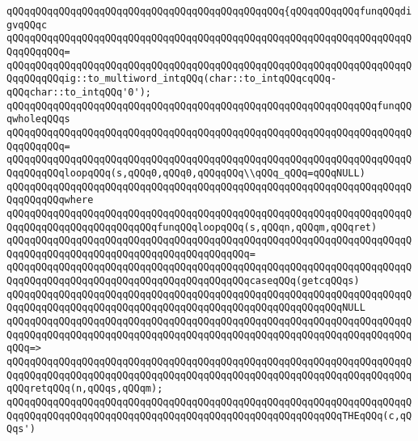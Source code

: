 \verb|qQQqqQQqqQQqqQQqqQQqqQQqqQQqqQQqqQQqqQQqqQQqqQQq{qQQqqQQqqQQqfunqQQqdigvqQQqc|\newline
\verb|qQQqqQQqqQQqqQQqqQQqqQQqqQQqqQQqqQQqqQQqqQQqqQQqqQQqqQQqqQQqqQQqqQQqqQQqqQQqqQQq=|\newline
\verb|qQQqqQQqqQQqqQQqqQQqqQQqqQQqqQQqqQQqqQQqqQQqqQQqqQQqqQQqqQQqqQQqqQQqqQQqqQQqqQQqig::to_multiword_intqQQq(char::to_intqQQqcqQQq-qQQqchar::to_intqQQq'0');|\newline
\newline
\verb|qQQqqQQqqQQqqQQqqQQqqQQqqQQqqQQqqQQqqQQqqQQqqQQqqQQqqQQqqQQqqQQqfunqQQqwholeqQQqs|\newline
\verb|qQQqqQQqqQQqqQQqqQQqqQQqqQQqqQQqqQQqqQQqqQQqqQQqqQQqqQQqqQQqqQQqqQQqqQQqqQQqqQQq=|\newline
\verb|qQQqqQQqqQQqqQQqqQQqqQQqqQQqqQQqqQQqqQQqqQQqqQQqqQQqqQQqqQQqqQQqqQQqqQQqqQQqqQQqloopqQQq(s,qQQq0,qQQq0,qQQqqQQq\\qQQq_qQQq=qQQqNULL)|\newline
\verb|qQQqqQQqqQQqqQQqqQQqqQQqqQQqqQQqqQQqqQQqqQQqqQQqqQQqqQQqqQQqqQQqqQQqqQQqqQQqqQQqwhere|\newline
\verb|qQQqqQQqqQQqqQQqqQQqqQQqqQQqqQQqqQQqqQQqqQQqqQQqqQQqqQQqqQQqqQQqqQQqqQQqqQQqqQQqqQQqqQQqqQQqqQQqfunqQQqloopqQQq(s,qQQqn,qQQqm,qQQqret)|\newline
\verb|qQQqqQQqqQQqqQQqqQQqqQQqqQQqqQQqqQQqqQQqqQQqqQQqqQQqqQQqqQQqqQQqqQQqqQQqqQQqqQQqqQQqqQQqqQQqqQQqqQQqqQQqqQQqqQQq=|\newline
\verb|qQQqqQQqqQQqqQQqqQQqqQQqqQQqqQQqqQQqqQQqqQQqqQQqqQQqqQQqqQQqqQQqqQQqqQQqqQQqqQQqqQQqqQQqqQQqqQQqqQQqqQQqqQQqqQQqcaseqQQq(getcqQQqs)|\newline
\newline
\verb|qQQqqQQqqQQqqQQqqQQqqQQqqQQqqQQqqQQqqQQqqQQqqQQqqQQqqQQqqQQqqQQqqQQqqQQqqQQqqQQqqQQqqQQqqQQqqQQqqQQqqQQqqQQqqQQqqQQqqQQqqQQqqQQqNULL|\newline
\verb|qQQqqQQqqQQqqQQqqQQqqQQqqQQqqQQqqQQqqQQqqQQqqQQqqQQqqQQqqQQqqQQqqQQqqQQqqQQqqQQqqQQqqQQqqQQqqQQqqQQqqQQqqQQqqQQqqQQqqQQqqQQqqQQqqQQqqQQqqQQqqQQq=>|\newline
\verb|qQQqqQQqqQQqqQQqqQQqqQQqqQQqqQQqqQQqqQQqqQQqqQQqqQQqqQQqqQQqqQQqqQQqqQQqqQQqqQQqqQQqqQQqqQQqqQQqqQQqqQQqqQQqqQQqqQQqqQQqqQQqqQQqqQQqqQQqqQQqqQQqretqQQq(n,qQQqs,qQQqm);|\newline
\newline
\verb|qQQqqQQqqQQqqQQqqQQqqQQqqQQqqQQqqQQqqQQqqQQqqQQqqQQqqQQqqQQqqQQqqQQqqQQqqQQqqQQqqQQqqQQqqQQqqQQqqQQqqQQqqQQqqQQqqQQqqQQqqQQqqQQqTHEqQQq(c,qQQqs')|\newline
